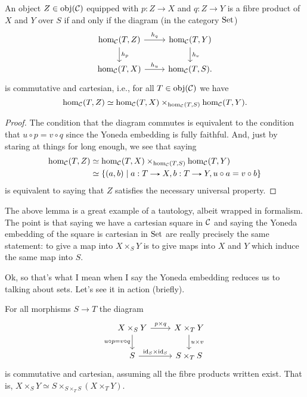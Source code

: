 \begin{lemma}
  \label{magic}
  An object $Z \in \operatorname{obj}(\mathcal{C})$ equipped with $p : Z \to X$ and $q : Z \to
  Y$ is a fibre product of $X$ and $Y$ over $S$ if and only if the
  diagram (in the category $\mathrm{Set}$)
  \[
  \begin{tikzcd}
    \hom_\C(T, Z) \rar{h_q} \dar{h_p} & \hom_\C(T, Y) \dar{h_v}
    \\ \hom_\C(T,X) \rar{h_u} & \hom_\C(T,S).
  \end{tikzcd}
  \]
  is commutative and cartesian, i.e., for all $T \in \operatorname{obj}(\mathcal{C})$ we have
  \[
  \hom_{\mathcal{C}}(T,Z) \simeq \hom_{\mathcal{C}}(T,X) \times_{\hom_{\mathcal{C}}(T,S)}
  \hom_{\mathcal{C}}(T,Y).
  \]
\end{lemma}

\begin{proof}
  The condition that the diagram commutes is equivalent to the
  condition that $u \circ p = v \circ q$ since the Yoneda embedding is
  fully faithful. And, just by staring at things for long enough, we
  see that saying
  \begin{align*}
  \hom_\C(T,Z) &\simeq \hom_\C(T,X) \times_{\hom_\C(T,S)} \hom_\C(T,Y)
  \\ &\simeq \{(a, b) \mid a : T \to X, b : T \to Y, u \circ a = v
  \circ b\}
  \end{align*}
  is equivalent to saying that $Z$ satisfies the necessary universal
  property.
\end{proof}

\begin{remark}
  The above lemma is a great example of a tautology, albeit wrapped in
  formalism. The point is that saying we have a cartesian square in
  $\mathcal{C}$ and saying the Yoneda embedding of the square is cartesian in
  $\mathrm{Set}$ are really precisely the same statement: to give a map into
  $X \times_S Y$ is to give maps into $X$ and $Y$ which induce the
  same map into $S$.
\end{remark}

Ok, so that's what I mean when I say the Yoneda embedding reduces us
to talking about sets. Let's see it in action (briefly).

\begin{lemma}
  For all morphisms $S \to T$ the diagram
  \[
  \begin{tikzcd}
    X \times_S Y \rar{p \times q} \ar{d}[left]{u \circ p = v \circ q}
    & X \times_T Y \dar{u \times v} \\ S \rar{\id_S \times \id_S} & S
    \times_T S
  \end{tikzcd}
  \]
  is commutative and cartesian, assuming all the fibre products
  written exist. That is, $X \times_S Y \simeq S \times_{S \times_T S}
  (X \times_T Y)$.
\end{lemma}

